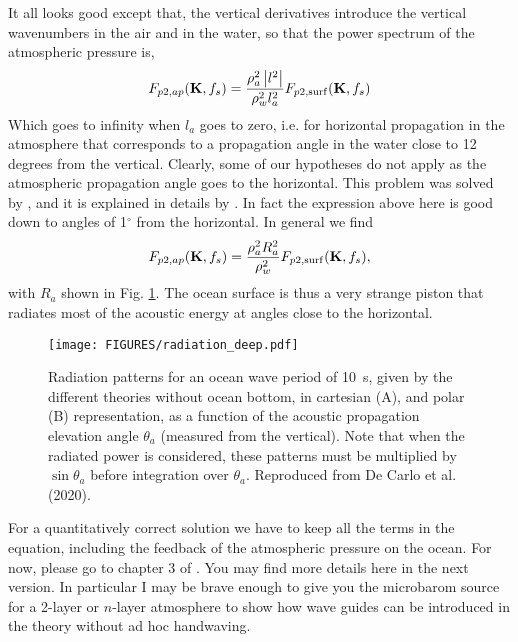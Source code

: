 It all looks good except that, the vertical derivatives introduce the vertical wavenumbers in the air and in the water, so that the power spectrum of the atmospheric pressure is, 
\begin{equation}
F_{p2,ap}(\mathbf{K},f_s)= \frac{\rho_a^2 \left|l^2\right|}{\rho_w^2 l_a^2 } 
F_{p2,\mathrm{surf}}(\mathbf{K} ,f_s)
\end{equation}
Which goes to infinity when $l_a$ goes to zero, i.e. for horizontal propagation in the atmosphere that corresponds to a propagation angle in the water close to 12 degrees from the vertical. Clearly, some of our hypotheses do not apply as the atmospheric propagation angle goes to the horizontal. This problem was solved by \cite{Brekhovskikh&al.1973}, and it is explained in details by \cite{DeCarlo2020}. In fact the expression above here is good down to angles of 1$^\circ$ from the horizontal. In general we find 
\begin{equation}
F_{p2,ap}(\mathbf{K},f_s)= \frac{\rho_a^2 R_a^2}{\rho_w^2 } 
F_{p2,\mathrm{surf}}(\mathbf{K} ,f_s),
\end{equation}
with $R_a$ shown in Fig. \ref{fig:rad_deep}.
The ocean surface is thus a very strange piston that radiates most of the acoustic energy at angles close to the horizontal.
\begin{figure}[htb]
\centering
\texttt{[image: FIGURES/radiation\_deep.pdf]}
\caption{Radiation patterns for an ocean wave period of 10~s, given by the different theories without ocean bottom, in cartesian (A), and polar (B) representation, as a function of the acoustic propagation elevation angle $\theta_a$ (measured from the vertical). Note that when the radiated power is considered, these patterns must be multiplied by $\sin \theta_a$ before integration over $\theta_a$. Reproduced from De Carlo et al. (2020). %
  }
\label{fig:rad_deep}
\end{figure}

For a quantitatively correct solution we have to keep all the terms in the equation, including the feedback of the atmospheric pressure on the ocean.
For now, please go to chapter 3 of \cite{DeCarlo2020}. You may find more details here in the next version. In particular I may be brave enough to give you the microbarom source for a 2-layer or $n$-layer atmosphere to show how wave guides can be introduced in the theory without ad hoc handwaving. 



